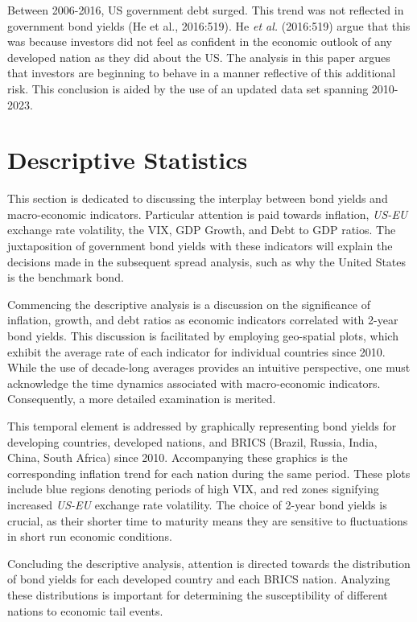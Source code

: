 \documentclass[11pt,preprint, authoryear]{elsarticle}
\numberwithin{equation}{section}
\numberwithin{figure}{section}
\numberwithin{table}{section}
\begin{document}
Between 2006-2016, US government debt surged. This trend was not
reflected in government bond yields (He et al., 2016:519). He \emph{et
al.} (2016:519) argue that this was because investors did not feel as
confident in the economic outlook of any developed nation as they did
about the US. The analysis in this paper argues that investors are
beginning to behave in a manner reflective of this additional risk. This
conclusion is aided by the use of an updated data set spanning
2010-2023.

\hypertarget{descriptive-statistics}{%
\section{Descriptive Statistics}\label{descriptive-statistics}}

This section is dedicated to discussing the interplay between bond
yields and macro-economic indicators. Particular attention is paid
towards inflation, \emph{US-EU} exchange rate volatility, the VIX, GDP
Growth, and Debt to GDP ratios. The juxtaposition of government bond
yields with these indicators will explain the decisions made in the
subsequent spread analysis, such as why the United States is the
benchmark bond.

Commencing the descriptive analysis is a discussion on the significance
of inflation, growth, and debt ratios as economic indicators correlated
with 2-year bond yields. This discussion is facilitated by employing
geo-spatial plots, which exhibit the average rate of each indicator for
individual countries since 2010. While the use of decade-long averages
provides an intuitive perspective, one must acknowledge the time
dynamics associated with macro-economic indicators. Consequently, a more
detailed examination is merited.

This temporal element is addressed by graphically representing bond
yields for developing countries, developed nations, and BRICS (Brazil,
Russia, India, China, South Africa) since 2010. Accompanying these
graphics is the corresponding inflation trend for each nation during the
same period. These plots include blue regions denoting periods of high
VIX, and red zones signifying increased \emph{US-EU} exchange rate
volatility. The choice of 2-year bond yields is crucial, as their
shorter time to maturity means they are sensitive to fluctuations in
short run economic conditions.

Concluding the descriptive analysis, attention is directed towards the
distribution of bond yields for each developed country and each BRICS
nation. Analyzing these distributions is important for determining the
susceptibility of different nations to economic tail events.
\end{document}
